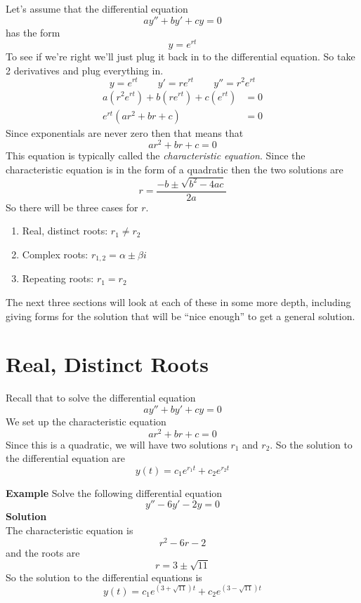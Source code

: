 \documentclass[10pt,reqno]{book}
\theoremstyle{definition}
\begin{document}
	Let's assume that the differential equation
	\begin{equation}
		ay'' + by' + cy = 0
	\end{equation}
	has the form
	\begin{equation}
		y = e^{rt}
	\end{equation}
	To see if we're right we'll just plug it back in to the differential equation. So take 2 derivatives and plug everything in.
	\[ y = e^{rt} \qquad y' = re^{rt} \qquad y'' = r^2 e^{rt} \]
	\begin{align*}
		a(r^2 e^{rt}) + b(re^{rt}) + c(e^{rt}) &= 0\\
		e^{rt}(ar^2 + br + c) &= 0
	\end{align*}
	Since exponentials are never zero then that means that
	\begin{equation}
		ar^2 + br + c = 0
	\end{equation}
	This equation is typically called the \textit{characteristic equation}. Since the characteristic equation is in the form of a quadratic then the two solutions are
	\[ r = \frac{-b \pm \sqrt{b^2 - 4ac}}{2a} \]
	So there will be three cases for $ r $.
	\begin{enumerate}
		\item Real, distinct roots: $ r_1 \neq r_2 $
		\item Complex roots: $ r_{1,2} = \alpha \pm \beta i $
		\item Repeating roots: $ r_1 = r_2 $
	\end{enumerate}
	The next three sections will look at each of these in some more depth, including giving forms for the solution that will be “nice enough” to get a general solution.

	\section{Real, Distinct Roots}

	Recall that to solve the differential equation
	\[ ay'' + by' + cy = 0 \]
	We set up the characteristic equation
	\[ ar^2 + br + c = 0 \]
	Since this is a quadratic, we will have two solutions $ r_1 $ and $ r_2 $. So the solution to the differential equation are
	\[ y(t) = c_1e^{r_1 t} + c_2e^{r_2 t} \]

	\noindent \textbf{Example} Solve the following differential equation
	\[ y'' - 6y' - 2y = 0 \]
	\textbf{Solution}\\
	The characteristic equation is
	\[ r^2 - 6r - 2 \]
	and the roots are
	\[ r = 3 \pm \sqrt{11} \]
	So the solution to the differential equations is
	\[ y(t) = c_1e^{(3 + \sqrt{11})t} + c_2e^{(3 - \sqrt{11})t} \]
\end{document}
